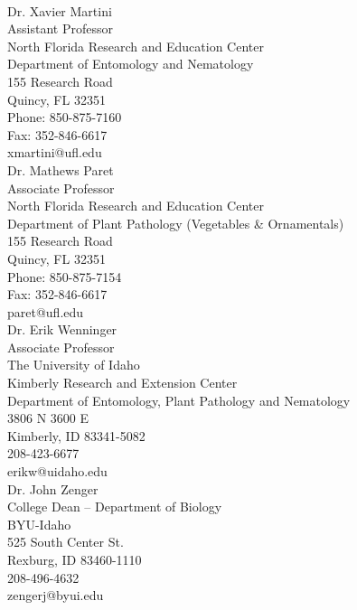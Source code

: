 \documentclass[11pt]{letter} %
\begin{document}
\begin{letter}
\\
Dr. Xavier Martini\\
Assistant Professor\\
North Florida Research and Education Center\\
Department of Entomology and Nematology\\
155 Research Road\\
Quincy, FL 32351\\
Phone: 850-875-7160\\
Fax: 352-846-6617\\
xmartini@ufl.edu\\

Dr. Mathews Paret\\
Associate Professor\\
North Florida Research and Education Center\\
Department of Plant Pathology (Vegetables \& Ornamentals)\\
155 Research Road\\
Quincy, FL 32351\\
Phone: 850-875-7154\\
Fax: 352-846-6617\\
paret@ufl.edu\\

Dr. Erik Wenninger\\
Associate Professor\\
The University of Idaho\\
Kimberly Research and Extension Center\\
Department of Entomology, Plant Pathology and Nematology\\
3806 N 3600 E\\
Kimberly, ID 83341-5082\\
208-423-6677\\
erikw@uidaho.edu\\

Dr. John Zenger\\
College Dean – Department of Biology\\
BYU-Idaho\\
525 South Center St.\\
Rexburg, ID 83460-1110\\
208-496-4632\\
zengerj@byui.edu\\


\end{letter}
\end{document}
